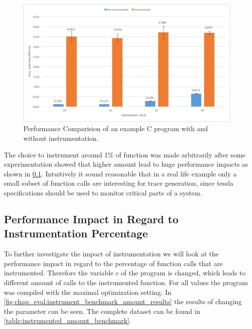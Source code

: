 \begin{figure}
  \includegraphics[angle=90,origin=c,width=\textwidth]{gfx/instrumentation_time_benchmark}
  \caption{Performance Comparision of an example C program with and without instrumentation.}
\label{fig:chap_eval:instrument_benchmark_results}
\end{figure}

The choice to instrument around 1\% of function was made arbitrarily after some experimentation showed that higher amount lead to huge performance impacts as shown in \cref{sec:evaluation:instrumentation_benchmark:instr_amount}.
Intuitively it sound reasonable that in a real life example only a small subset of function calls are interesting for trace generation, since \gls{tessla} specifications should be used to monitor critical parts of a system.

\subsection{Performance Impact in Regard to Instrumentation Percentage}
\label{sec:evaluation:instrumentation_benchmark:instr_amount}

To further investigate the impact of instrumentation we will look at the performance impact in regard to the percentage of function calls that are instrumented.
Therefore the variable \(c\) of the program is changed, which leads to different amount of calls to the instrumented function.
For all values the program was compiled with the maximal optimization setting.
In \cref{fig:chap_eval:instrument_benchmark_amount_results} the results of changing the parameter can be seen.
The complete dataset can be found in \cref{table:instrumented_amount_benchmark}.

